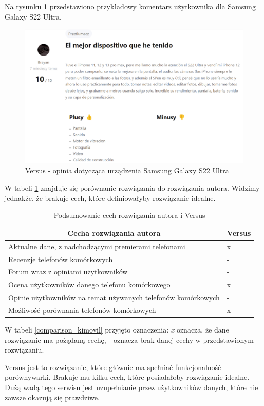 Na rysunku \ref*{versus_4} przedstawiono przykładowy komentarz użytkownika dla Samsung Galaxy S22 Ultra.
\begin{figure}[H]
    \centering
    \includegraphics[scale=0.45]{img/versus/versusKomentarze.png}
    \caption{Versus - opinia dotycząca urządzenia Samsung Galaxy S22 Ultra}
    \label{versus_4}
\end{figure}
W tabeli \ref{comparison_versus} znajduje się porównanie rozwiązania do rozwiązania autora. Widzimy jednakże, że brakuje cech, które definiowałyby rozwiązanie idealne.
\begin{table}
    \centering
    \begin{tabular}{|l|l|}
        \hline
        \multicolumn{1}{|c|}{Cecha rozwiązania autora} & \multicolumn{1}{c|}{Versus} \\ \hline
        Aktualne dane, z nadchodzącymi premierami telefonami & x \\ \hline
        Recenzje telefonów komórkowych & - \\ \hline
        Forum wraz z opiniami użytkowników & - \\ \hline
        Ocena użytkowników danego telefonu komórkowego & x \\ \hline
        Opinie użytkowników na temat używanych telefonów komórkowych & - \\ \hline
        Możliwość porównania telefonów komórkowych & x \\ \hline
    \end{tabular}
    \caption{Podsumowanie cech rozwiązania autora i Versus}
    \label{comparison_versus}
\end{table}
W tabeli \ref{comparison_kimovil} przyjęto oznaczenia: \textit{x} oznacza, że dane rozwiązanie ma pożądaną cechę, \textit{-} oznacza brak danej cechy w przedstawionym rozwiązaniu.

Versus jest to rozwiązanie, które głównie ma spełniać funkcjonalność porównywarki. Brakuje mu kilku cech, które posiadałoby rozwiązanie idealne. Dużą wadą tego serwisu jest uzupełnianie przez użytkowników danych, które nie zawsze okazują się prawdziwe.
